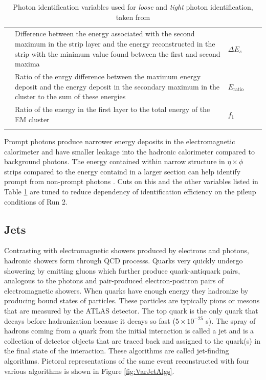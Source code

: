 \begin{center}
\begin{table}
{{\begin{tabularx}{1.25 \textwidth}{ l X lll }
		 & Difference between the energy associated with the second maximum in the strip layer and the energy reconstructed in the strip with the minimum value found between the first and second maxima & $\Delta E_s$ &  &   \checkmark \\
		 & Ratio of the enrgy difference between the maximum energy deposit and the energy deposit in the secondary maximum in the cluster to the sum of these energies & $E_\text{ratio}$ &  &  \checkmark \\
		 & Ratio of the energy in the first layer to the total energy of the EM cluster & $f_1$ &  &  \checkmark \\
\hhline{=====}
\end{tabularx}
\normalsize
}}
\caption[Photon identification variables used for \textit{loose} and \textit{tight} photon identification]{Photon identification variables used for \textit{loose} and \textit{tight} photon identification, taken from \cite{PhotonID}}
\label{tab:PhotonVars}

\end{table}
\end{center}

Prompt photons produce narrower energy deposits in the electromagnetic calorimeter and have smaller leakage into the hadronic calorimeter compared to background photons.  The energy contained within narrow structure in $\eta \times \phi$ strips compared to the energy containd in a larger section can help identify prompt from non-prompt photons \cite{PhotonID}.  Cuts on this and the other variables listed in Table \ref{tab:PhotonVars} are tuned to reduce dependency of identification efficiency on the pileup conditions of Run 2.


\subsection{Jets}

Contrasting with electromagnetic showers produced by electrons and photons, hadronic showers form through QCD processs.  Quarks very quickly undergo showering by emitting gluons which further produce quark-antiquark pairs, analogous to the photons and pair-produced electron-positron pairs of electromagnetic showers.   When quarks have enough energy they hadronize by producing bound states of particles.  These particles are typically pions or mesons that are measured by the ATLAS detector.  The top quark is the only quark that decays before hadronization because it decays so fast ($5\times10^{-25}$ s).  The spray of hadrons coming from a quark from the initial interaction is called a jet and is a collection of detector objects that are traced back and assigned to the quark(s) in the final state of the interaction.  These algorithms are called jet-finding algorithms.  Pictoral representations of the same event reconstructed with four various algorithms is shown in Figure \ref{fig:VarJetAlgs}.

